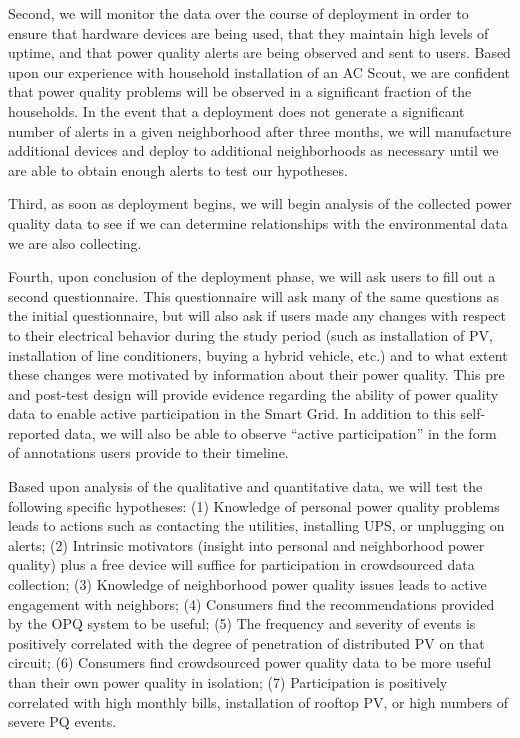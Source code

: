 \documentclass[11pt]{article}
\begin{document}
Second, we will monitor the data over the course of deployment in order to ensure that hardware devices are being used, that they maintain high levels of uptime, and that power quality alerts are being observed and sent to users.  Based upon our experience with household installation of an AC Scout, we are confident that power quality problems will be observed in a significant fraction of the households.  In the event that a deployment does not generate a significant number of alerts in a given neighborhood after three months, we will manufacture additional devices and deploy to additional neighborhoods as necessary until we are able to obtain enough alerts to test our hypotheses.

Third, as soon as deployment begins, we will begin analysis of the collected power quality data to see if we can determine relationships with the environmental data we are also collecting. 

Fourth, upon conclusion of the deployment phase, we will ask users to fill out a second questionnaire.  This questionnaire will ask many of the same questions as the initial questionnaire, but will also ask if users made any changes with respect to their electrical behavior during the study period (such as installation of PV, installation of line conditioners, buying a hybrid vehicle, etc.) and to what extent these changes were motivated by information about their power quality.  This pre and post-test design will provide evidence regarding the ability of power quality data to enable active participation in the Smart Grid.  In addition to this self-reported data, we will also be able to observe ``active participation'' in the form of annotations users provide to their timeline.

Based upon analysis of the qualitative and quantitative data, we will test the following specific hypotheses: (1) Knowledge of personal power quality problems leads to actions such as contacting the utilities, installing UPS, or unplugging on alerts; (2) Intrinsic motivators (insight into personal and neighborhood power quality) plus a free device will suffice for participation in crowdsourced data collection; (3) Knowledge of neighborhood power quality issues leads to active engagement with neighbors; (4) Consumers find the recommendations provided by the OPQ system to be useful; (5) The frequency and severity of events is positively correlated with the degree of penetration of distributed PV on that circuit; (6) Consumers find crowdsourced power quality data to be more useful than their own power quality in isolation; (7) Participation is positively correlated with high monthly bills, installation of rooftop PV, or high numbers of severe PQ events.
\end{document}

